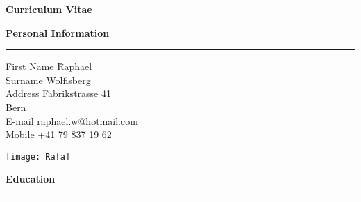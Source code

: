 



\graphicspath{{./Pictures/}}




\newpage
\pagestyle{empty}
\vspace{-9cm}

\huge
\textbf{Curriculum Vitae}

\bigskip
\bigskip
\bigskip
\large
\textbf{Personal Information}
\noindent\rule[3mm]{\linewidth}{1pt}

\normalsize
\vspace{0.05cm}
\begin{tabbing}
First Name \hspace*{2.4cm} \= Raphael \\
Surname \> Wolfisberg \\
Address \> Fabrikstrasse 41 \\
\>  Bern \\[0.1 cm]

E-mail \> raphael.w@hotmail.com \\
Mobile \> +41 79 837 19 62 
\end{tabbing}

\begin{addmargin}{0.03\textwidth}
\vspace{-4.55cm}
\begin{flushright}
\texttt{[image: Rafa]} \\[1cm]
\end{flushright}
\end{addmargin}


\vspace{-1.1cm}
\large
\textbf{Education}
\noindent\rule[3mm]{\linewidth}{1pt}

